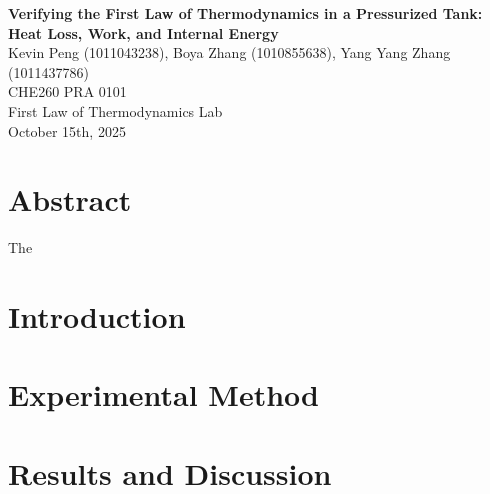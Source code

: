 \documentclass[12pt]{article}
\begin{document}
\begin{center}
\textbf{\Large Verifying the First Law of Thermodynamics in a Pressurized Tank: Heat Loss, Work, and Internal Energy} \\[0.5em]
Kevin Peng (1011043238), Boya Zhang (1010855638), Yang Yang Zhang (1011437786)\\[0.5em]
CHE260 PRA 0101 \\
First Law of Thermodynamics Lab \\
October 15th, 2025 \\
\end{center}

\section*{Abstract}
The 

\section{Introduction}

\section{Experimental Method}

\section{Results and Discussion}






\newpage
\begin{thebibliography}{9}

\end{thebibliography}
\end{document}
